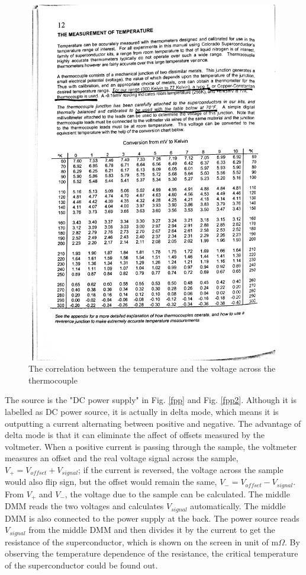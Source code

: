 \documentclass[prb,preprint]{revtex4-1}
\begin{document}
\begin{figure}[h]
\centering
\includegraphics[width=14cm]{temperature.pdf}
\caption{The correlation between the temperature and the voltage across the thermocouple}
\label{temp}
\end{figure}

The source is the "DC power supply" in Fig. \ref{fpp} and Fig. \ref{fpp2}. Although it is labelled as DC power source, it is actually in delta mode, which means it is outputting a current alternating between positive and negative. The advantage of delta mode is that it can eliminate the affect of offsets measured by the voltmeter. When a positive current is passing through the sample, the voltmeter measures an offset and the real voltage signal across the sample, $V_{+}=V_{offset}+V_{signal}$; if the current is reversed, the voltage across the sample would also flip sign, but the offset would remain the same, $V_{-}=V_{offset}-V_{signal}$. From $V_{+}$ and $V_{-}$, the voltage due to the sample can be calculated. The middle DMM reads the two voltages and calculates $V_{signal}$ automatically. The middle DMM is also connected to the power supply at the back. The power source reads $V_{signal}$ from the middle DMM and then divides it by the current to get the resistance of the superconductor, which is shown on the screen in unit of m$\Omega$. By observing the temperature dependence of the resistance, the critical temperature of the superconductor could be found out. \\
\end{document}
